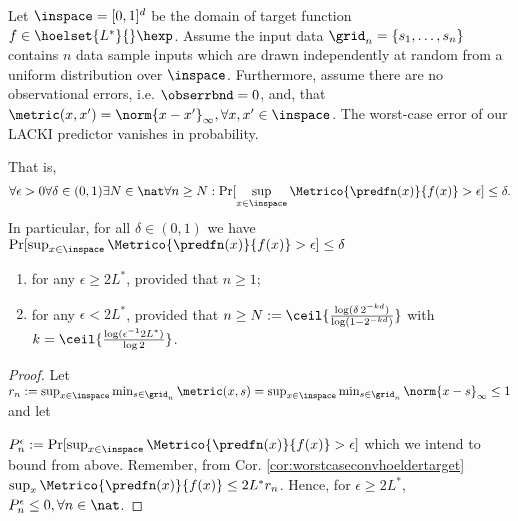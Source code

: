 \begin{thm} Let $\inspace = [0,1]^d $ be the domain of target function $f \in \hoelset {L^*} { } \hexp $. Assume the input data $\grid_n = \{s_1,\dots,s_n\}$ contains $n$ data sample inputs which are drawn independently at random from a uniform distribution over $\inspace$. Furthermore, assume there are no observational errors, i.e. $\obserrbnd =0$, and, that $\metric(x,x') = \norm{x-x'}_\infty, \forall x,x' \in \inspace$. The worst-case error of our LACKI predictor vanishes in probability. 

That is, 
$$\forall \epsilon >0 \forall \delta \in (0,1) \exists N \in \nat \forall n \geq N : \Pr[ \sup_{x \in \inspace} \Metrico{\predfn(x)}{f(x)} >\epsilon] \leq \delta.$$
In particular, for all $\delta \in (0,1)$ we have 
$\Pr[ \sup_{x \in \inspace} \Metrico{\predfn(x)}{f(x)} >\epsilon] \leq \delta$
\begin{enumerate}
\item  for any $\epsilon \geq 2 L^*$, provided that $n \geq 1$;
\item for any $\epsilon < 2 L^*$, provided that $n \geq N := \ceil{\frac{ \log(\delta \, 2^{-kd}  )}{\log(1- 2^{-kd})} }$ with $k= \ceil{\frac{\log(\epsilon^{-1}2 L^*)}{\log 2}}$.
\end{enumerate}
\begin{proof}
Let $r_n := \sup_{x \in \inspace} \min_{s \in \grid_n} \metric(x,s) = \sup_{x \in \inspace} \min_{s \in \grid_n} \norm{x-s}_\infty \leq 1$ and let 

$P_n^\epsilon := \Pr[ \sup_{x \in \inspace} \Metrico{\predfn(x)}{f(x)} >\epsilon]$ which we intend to bound from above.
Remember, from Cor. \ref{cor:worstcaseconvhoeldertarget} $\sup_x \Metrico{\predfn(x)}{f(x)} \leq 2 L^*  r_n $. Hence, for $\epsilon \geq 2 L^*$, $P_n^\epsilon \leq 0, \forall n \in \nat$.


\end{proof}
\end{thm}

